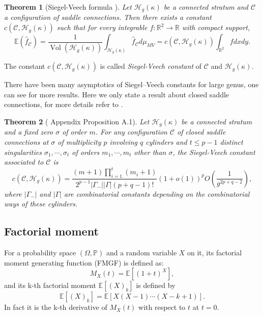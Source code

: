 \documentclass[12pt]{amsart} %
\newtheorem{theorem}{Theorem}[section]
\theoremstyle{definition}
\theoremstyle{remark}
\numberwithin{equation}{section}
\renewcommand\H{{\mathcal H}}
\newcommand{\V}{\operatorname{Vol}}
\begin{document}
\begin{theorem}[Siegel-Veech formula \cite{veech1998siegel}]\label{Siegel-Veech}
Let $\H_g(\kappa)$ be a connected stratum and $\mathcal{C}$ a configuration of saddle connections. 
Then there exists a constant $c(\mathcal{C},\H_g(\kappa))$ such that for every integrable 
$f:\mathbb{R}^2\to \mathbb{R}$ with compact support,
$$\mathbb{E}(\hat{f}_{\mathcal{C}})=\frac{1}{\V(\H_g(\kappa))}\int_{\H_g(\kappa)}\hat{f}_{\mathcal{C}}d\mu_{MV}=c(\mathcal{C},\H_g(\kappa))\int_{\mathbb{R}^2}fdxdy.$$

\end{theorem}
The constant $c(\mathcal{C},\H_g(\kappa))$ is called \emph{Siegel-Veech constant} of $\mathcal{C}$ and $\H_g(\kappa)$.

There have been many asymptotics of Siegel–Veech constants for large genus, 
one can see \cite{chen2018quasimodularity,sauvaget2018volumes,aggarwal2019large,aggarwal2020large,chen2020masur} for more results.
Here we only state a result about closed saddle connections, for more details refer to \cite{vallejos2024random}.
\begin{theorem}[\cite{vallejos2024random} Appendix Proposition A.1]\label{Siegel of closed}
Let $\H_g(\kappa)$ be a connected stratum and a fixed zero $\sigma$ of order $m$. 
For any configuration $\mathcal{C}$ of closed saddle connections at $\sigma$ of multiplicity $p$ involving $q$ cylinders and $t \leq p-1$ 
distinct singularities $\sigma_1,\cdots,\sigma_t$ of orders $m_1,\cdots, m_t$ other than $\sigma$, the Siegel-Veech constant associated to $\mathcal{C}$ is 
$$c(\mathcal{C},\H_g(\kappa))=\frac{(m+1)\prod_{i=1}^t(m_i+1)}{2^{p-1}|\Gamma_{-}||\Gamma|(p+q-1)!}(1+o(1))^pO(\frac{1}{g^{2p+q-2}}),$$
where $|\Gamma_{-}|$ and $|\Gamma|$ are combinatorial constants depending on the combinatorial ways of these cylinders.
\end{theorem}


\subsection{Factorial moment}
For a probability space $(\Omega,\mathbb{P})$ and a random variable $X$ on it, its factorial moment generating function (FMGF) is defined as:
$$M_X(t)=\mathbb{E}[(1+t)^X],$$
and its k-th factorial moment $\mathbb{E}[(X)_k]$ is defined by
$$\mathbb{E}[(X)_k]=\mathbb{E}[X(X-1)\cdots(X-k+1)].$$
In fact it is the k-th derivative of $M_X(t)$ with respect to $t$ at $t=0$.
\end{document}
